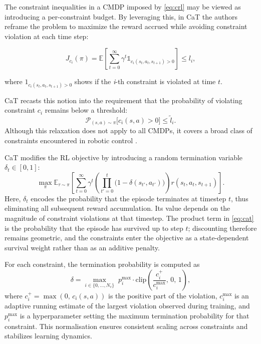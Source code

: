 The constraint inequalities in a CMDP imposed by \cref{eq:crl} may be viewed as introducing a per-constraint budget. By leveraging this, in CaT the authors reframe the problem to maximize the reward accrued while avoiding constraint violation at each time step:

\begin{equation}
    J_{c_i}(\pi)=\mathbb{E}\left[\sum_{t=0}^{\infty}\gamma^t\mathbb{1}_{c_i(s_t,a_t,s_{t+1})>0}\right] \leq l_i,
\end{equation}

where $1_{c_i(s_t,a_t,s_{t+1})>0}$ shows if the \textit{i}-th constraint is violated at time $t$. 

CaT recasts this notion into the requirement that the probability of violating constraint $c_i$ remains below a threshold:
%
\begin{equation}\label{eq:cat-relax}
    \mathcal{P}_{(s,a)\sim\pi}\bigl[c_i(s,a) > 0\bigr] \le \tilde{l}_i.
\end{equation}
%
Although this relaxation does not apply to all CMDPs, it covers a broad class of constraints encountered in robotic control \citep{nemirovski2007convex}.

CaT modifies the RL objective by introducing a random termination variable $\delta_t\in[0,1]$:
%
\begin{equation}\label{eq:cat}
\max_{\pi} 
\mathbb{E}_{\tau\sim\pi}\!\left[
\sum_{t=0}^{\infty}
\gamma^{t}\left(\prod_{t'=0}^{t}\bigl(1-\delta(s_{t'}, a_{t'})\bigr)\right)
r(s_t, a_t, s_{t+1})
\right].
\end{equation}
%
Here, $\delta_t$ encodes the probability that the episode terminates at timestep $t$, thus eliminating all subsequent reward accumulation. Its value depends on the magnitude of constraint violations at that timestep. The product term in \cref{eq:cat} is the probability that the episode has survived up to step $t$; discounting therefore remains geometric, and the constraints enter the objective as a state-dependent survival weight rather than as an additive penalty.

For each constraint, the termination probability is computed as
%
\begin{equation}\label{eq:cat-delta}
    \delta = 
    \max_{i\in\{0,\dots,N_c\}}\;
    p_i^{\max} \cdot 
    \mathrm{clip}\!\left(
        \frac{c_i^{+}}{c_i^{\max}},\,0,\,1
    \right),
\end{equation}
%
where $c_i^{+}=\max(0,\,c_i(s,a))$ is the positive part of the violation, $c_i^{\max}$ is an adaptive running estimate of the largest violation observed during training, and $p_i^{\max}$ is a hyperparameter setting the maximum termination probability for that constraint. This normalisation ensures consistent scaling across constraints and stabilizes learning dynamics.

